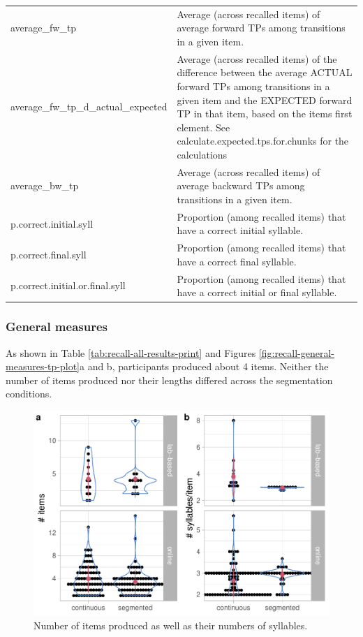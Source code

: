 \documentclass[
]{article}
\begin{document}
\begin{table}[!h]
{\begin{tabular}[t]{l>{\raggedright\arraybackslash}p{30em}}
average\_fw\_tp & Average (across recalled items) of average forward TPs among transitions in a given item.\\
average\_fw\_tp\_d\_actual\_expected & Average (across recalled items) of the difference between the average ACTUAL forward TPs among transitions in a given item and the EXPECTED forward TP in that item, based on the items first element. See calculate.expected.tps.for.chunks for the calculations\\
average\_bw\_tp & Average (across recalled items) of average backward TPs among transitions in a given item.\\
\addlinespace
p.correct.initial.syll & Proportion (among recalled items) that have a correct initial syllable.\\
p.correct.final.syll & Proportion (among recalled items) that have a correct final syllable.\\
p.correct.initial.or.final.syll & Proportion (among recalled items) that have a correct initial or final syllable.\\
\bottomrule
\end{tabular}}
\end{table}

\hypertarget{general-measures}{%
\subsubsection{General measures}\label{general-measures}}

As shown in Table \ref{tab:recall-all-results-print} and Figures
\ref{fig:recall-general-measures-tp-plot}a and b, participants produced
about 4 items. Neither the number of items produced nor their lengths
differed across the segmentation conditions.

\begin{figure}

{\centering \includegraphics[width=0.8\linewidth]{segmentation_recall_combined_for_revision_files/figure-latex/recall-general-measures-plot-1} 

}

\caption{Number of items produced as well as their numbers of syllables.}\label{fig:recall-general-measures-plot}
\end{figure}
\end{document}
